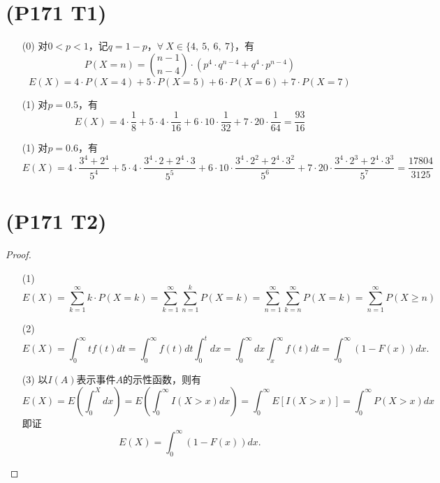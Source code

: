 \documentclass{article}
\begin{document}
\section{(P171 T1)}  %
\begin{enumerate}
    \item [(0)]对$0<p<1$，记$q=1-p$，$\forall\ X\in \{4,\ 5,\ 6,\ 7 \}$，有
    \[
        P(X=n) = \binom{n-1}{n-4} \cdot (p^4 \cdot q^{n-4} + q^4 \cdot p^{n-4})   
    \]
    \[
        E(X) = 4\cdot P(X=4) + 5 \cdot P(X=5) + 6\cdot P(X=6) + 7\cdot P(X=7)
    \]
    \item [(1)]对$p=0.5$，有
    \[
        E(X) = 4 \cdot \frac{1}{8} + 5 \cdot 4 \cdot \frac{1}{16} + 
        6 \cdot 10 \cdot \frac{1}{32} + 7 \cdot 20 \cdot \frac{1}{64}
        = \frac{93}{16}
    \]
    \item [(1)]对$p=0.6$，有
    \[
        E(X) 
        = 
        4 \cdot \frac{3^4 + 2^4}{5^4}
        + 5 \cdot 4 \cdot \frac{3^4\cdot 2 + 2^4 \cdot 3}{5^5}
        + 6 \cdot 10 \cdot \frac{3^4\cdot 2^2 + 2^4 \cdot 3^2}{5^6} 
        + 7 \cdot 20 \cdot \frac{3^4\cdot 2^3 + 2^4 \cdot 3^3}{5^7}
        = \frac{17804}{3125}
    \]
\end{enumerate}


\section{(P171 T2)}  %
\begin{proof}
    \begin{enumerate}
        \item []
        \item [(1)]
        \[
            E(X) 
            = \sum\limits_{k=1}^{\infty} k \cdot P(X=k)    
            = \sum\limits_{k=1}^{\infty} \sum\limits_{n=1}^{k} P(X=k)
            = \sum\limits_{n=1}^{\infty} \sum\limits_{k=n}^{\infty} P(X=k)
            = \sum\limits_{n=1}^{\infty} P(X\geq n)
        \]
        \item [(2)]
        \[
            E(X)
            = \int_{0}^{\infty} t f(t) dt 
            = \int_{0}^{\infty} f(t) dt \int_{0}^{t} dx
            = \int_{0}^{\infty} dx \int_{x}^{\infty} f(t) dt
            = \int_{0}^{\infty} (1- F(x)) dx.
         \]
        \item [(3)]以$I(A)$表示事件$A$的示性函数，则有
        \[
            E(X) 
            = E\left( \int_{0}^{X} dx \right)
            = E\left( \int_{0}^{\infty} I(X>x)dx \right)
            = \int_{0}^{\infty} E\left[ I(X>x) \right]
            = \int_{0}^{\infty} P(X>x) dx
        \]
        即证
        \[
            E(X) = \int_{0}^{\infty} (1- F(x)) dx.
        \]
    \end{enumerate}
\end{proof}
\end{document}
